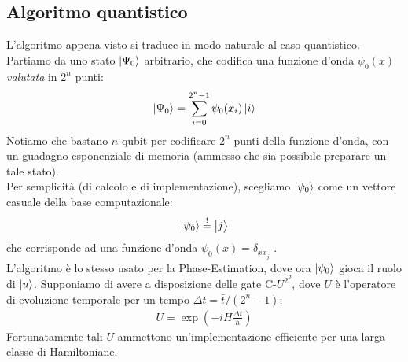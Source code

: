 \documentclass[../../InformazioneQuantistica.tex]{subfiles}
\begin{document}
\subsection{Algoritmo quantistico}
L'algoritmo appena visto si traduce in modo naturale al caso quantistico. Partiamo da uno stato $\Ket{\Psi_0}$ arbitrario, che codifica una funzione d'onda $\psi_0(x)$ \textit{valutata} in $2^n$ punti:
\begin{align*}
\Ket{\Psi_0} = \sum_{i=0}^{2^n-1} \psi_0(x_i)\Ket{i}
\end{align*}
Notiamo che bastano $n$ qubit per codificare $2^n$ punti della funzione d'onda, con un guadagno esponenziale di memoria (ammesso che sia possibile preparare un tale stato).\\
Per semplicità (di calcolo e di implementazione), scegliamo $\Ket{\psi_0}$ come un vettore casuale della base computazionale:
\begin{align*}
    \Ket{\psi_0} \overset{!}{=} \Ket{\bar{j}}
\end{align*}
che corrisponde ad una funzione d'onda $\psi_0(x) = \delta_{x x_{\bar{j}}}$ .\\

L'algoritmo è lo stesso usato per la Phase-Estimation, dove ora $\Ket{\psi_0}$ gioca il ruolo di $\Ket{u}$. Supponiamo di avere a disposizione delle gate C-$U^{2^J}$, dove $U$ è l'operatore di evoluzione temporale per un tempo $\Delta t = \bar{t}/(2^{n}-1)$:
\begin{align*}
U = \exp\left(-i H \frac{\Delta t}{\hbar}\right)
\end{align*}
Fortunatamente tali $U$ ammettono un'implementazione efficiente per una larga classe di Hamiltoniane.\\
\end{document}
